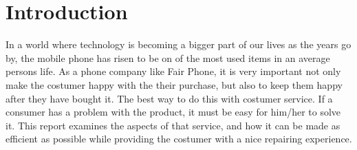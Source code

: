 \documentclass[final]{scrreprt} %
\begin{document}
\chapter{Introduction}

In a world where technology is becoming a bigger part of our lives as the years go by, the mobile phone has risen to be on of the most used items in an average persons life. As a phone company like Fair Phone, it is very important not only make the costumer happy with the their purchase, but also to keep them happy after they have bought it. The best way to do this with costumer service. If a consumer has a problem with the product, it must be easy for him/her to solve it. This report examines the aspects of that service, and how it can be made as efficient as possible while providing the costumer with a nice repairing experience.
\end{document}

